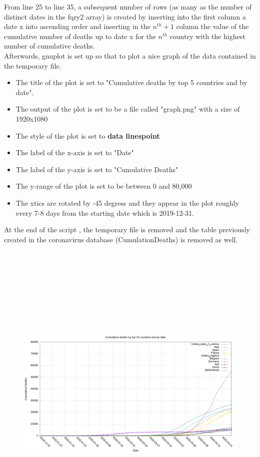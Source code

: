 \documentclass{article}
\begin{document}
From line 25 to line 35, a subsequent number of rows (as many as the number of distinct dates in the fqry2 array) is created by inserting into the first column a date x into ascending order and inserting in the $n^{th}+1$ column the value of the cumulative number of deaths up to date x for the $n^{th}$ country with the highest number of cumulative deaths.\\
Afterwards, gnuplot is set up so that to plot a nice graph of the data contained in the temporary file.
\begin{itemize}
    \item The title of the plot is set to  "Cumulative  deaths  by top 5 countries  and by date".
    \item The output of the plot is set to be a file called "graph.png" with a size of 1920x1080
    \item The style of the plot is set to \textbf{data linespoint}
    \item The label of the x-axis is set to "Date"
    \item The label of the y-axis is set to "Cumulative Deaths"
    \item The y-range of the plot is set to be between 0 and 80,000
    \item The xtics are rotated by -45 degress and they appear in the plot roughly every 7-8 days from the starting date which is 2019-12-31.
\end{itemize}


At the end of the script , the temporary file is removed and the table previously created in the coronavirus database (CumulationDeaths) is removed as well.
\begin{figure}[h]
    \centering
    \includegraphics[width=18cm,height=15cm]{graph.png}
    \label{fig:my_label}
\end{figure}
\end{document}
